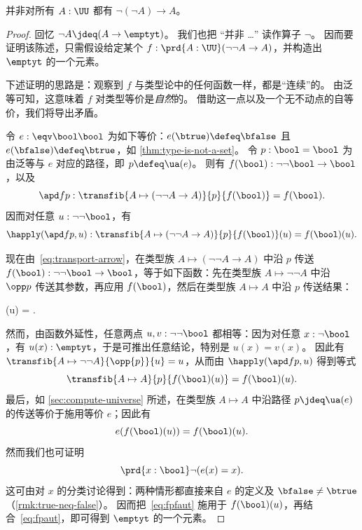 \begin{thm}\label{thm:not-dneg}
  并非对所有 $A:\UU$ 都有 $\neg(\neg A) \to A$。
\end{thm}
\begin{proof}
  回忆 $\neg A \jdeq (A\to\emptyt)$。
  我们也把 ``并非 \dots'' 读作算子 $\neg$。
  因而要证明该陈述，只需假设给定某个 $f:\prd{A:\UU} (\neg\neg A \to A)$，并构造出 $\emptyt$ 的一个元素。

  下述证明的思路是：观察到 $f$ 与类型论中的任何函数一样，都是“连续”的。
  由泛等可知，这意味着 $f$ 对类型等价是\emph{自然}的。
  借助这一点以及一个无不动点的自等价，我们将导出矛盾。

  令 $e:\eqv\bool\bool$ 为如下等价：$e(\btrue)\defeq\bfalse$ 且 $e(\bfalse)\defeq\btrue$，如 \cref{thm:type-is-not-a-set}。
  令 $p:\bool=\bool$ 为由泛等与 $e$ 对应的路径，即 $p\defeq \ua(e)$。
  则有 $f(\bool) : \neg\neg\bool \to\bool$，以及
  \[\apd f p : \transfib{A\mapsto (\neg\neg A \to A)}{p}{f(\bool)} = f(\bool).\]
  因而对任意 $u:\neg\neg\bool$，有
  \[\happly(\apd f p,u) : \transfib{A\mapsto (\neg\neg A \to A)}{p}{f(\bool)}(u) = f(\bool)(u).\]

  现在由~\eqref{eq:transport-arrow}，在类型族 ${A\mapsto (\neg\neg A \to A)}$ 中沿 $p$ 传送 $f(\bool):\neg\neg\bool\to\bool$，等于如下函数：先在类型族 $A\mapsto \neg\neg A$ 中沿 $\opp p$ 传送其参数，再应用 $f(\bool)$，然后在类型族 $A\mapsto A$ 中沿 $p$ 传送结果：
  \begin{narrowmultline*}
    (u) =
    \narrowbreak
    .
  \end{narrowmultline*}
  然而，由函数外延性，任意两点 $u,v:\neg\neg\bool$ 都相等：因为对任意 $x:\neg\bool$，有 $u(x):\emptyt$，于是可推出任意结论，特别是 $u(x)=v(x)$。
  因此有 $\transfib{A\mapsto \neg\neg A}{\opp{p}}{u} = u$，从而由 $\happly(\apd f p,u)$ 得到等式
  \[ \transfib{A\mapsto A}{p}{f(\bool)(u)} = f(\bool)(u).\]
  最后，如 \cref{sec:compute-universe} 所述，在类型族 $A\mapsto A$ 中沿路径 $p\jdeq \ua(e)$ 的传送等价于施用等价 $e$；因此有
  \begin{equation}
    e(f(\bool)(u)) = f(\bool)(u).\label{eq:fpaut}
  \end{equation}
  然而我们也可证明
  \begin{equation}
    \prd{x:\bool} \neg(e(x)=x).\label{eq:fpfaut}
  \end{equation}
  这可由对 $x$ 的分类讨论得到：两种情形都直接来自 $e$ 的定义及 $\bfalse\neq\btrue$（\cref{rmk:true-neq-false}）。
  因而把~\eqref{eq:fpfaut} 施用于 $f(\bool)(u)$，再结合~\eqref{eq:fpaut}，即可得到 $\emptyt$ 的一个元素。
\end{proof}

